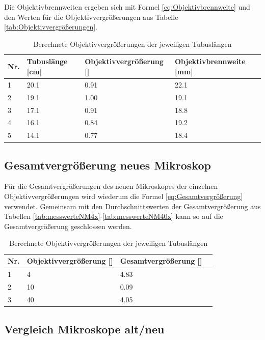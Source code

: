 \documentclass[12pt,a4paper,twoside]{article}
\begin{document}
Die Objektivbrennweiten ergeben sich mit Formel \ref{eq:Objektivbrennweite} und den Werten für die Objektivvergrößerungen aus Tabelle \ref{tab:Objektivvergrößerungen}.

\begin{table}[H]
    \centering
    \caption{Berechnete Objektivvergrößerungen der jeweiligen Tubuslängen}
    \label{tab:Okularvergrößerungen}
    \begin{tabular}{| l | l | l | l |}
        \hline
        Nr.   & Tubuslänge [cm]  & Objektivvergrößerung [] & Objektivbrennweite [mm] \\
        \hline
        1 & 20.1 & 0.91 & 22.1 \\
        2 & 19.1 & 1.00 & 19.1 \\
        3 & 17.1 & 0.91 & 18.8 \\
        4 & 16.1 & 0.84 & 19.2 \\
        5 & 14.1 & 0.77 & 18.4 \\
        \hline
    \end{tabular}
\end{table}

\subsection{Gesamtvergrößerung neues Mikroskop}

Für die Gesamtvergrößerungen des neuen Mikroskopes der einzelnen Objektivvergrößerungen wird wiederum die Formel \ref{eq:Gesamtvergrößerung} verwendet.
Gemeinsam mit den Durchschnittswerten der Gesamtvergrößerung aus Tabellen \ref{tab:messwerteNM4x}-\ref{tab:messwerteNM40x} kann so auf die Gesamtvergrößerung geschlossen werden.

\begin{table}[H]
    \centering
    \caption{Berechnete Objektivvergrößerungen der jeweiligen Tubuslängen}
    \label{tab:Okularvergrößerungen}
    \begin{tabular}{| l | l | l | l |}
        \hline
        Nr.   & Objektivvergrößerung [] & Gesamtvergrößerung [] \\
        \hline
        1 & 4 & 4.83 \\
        2 & 10 & 0.09 \\
        3 & 40 & 4.05 \\
        \hline
    \end{tabular}
\end{table}



\subsection{Vergleich Mikroskope alt/neu}
\end{document}
